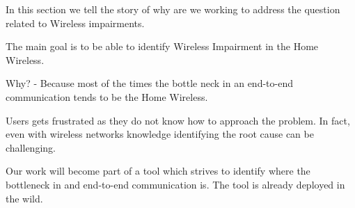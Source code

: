 In this section we tell the story of why are we working to address the question related to Wireless impairments.

The main goal is to be able to identify Wireless Impairment in the Home Wireless.

Why? - Because most of the times the bottle neck in an end-to-end communication tends to be the Home Wireless.

Users gets frustrated as they do not know how to approach the problem. In fact, even with wireless networks knowledge identifying the root cause can be challenging.

Our work will become part of a tool which strives to identify where the bottleneck in and end-to-end communication is. The tool is already deployed in the wild.